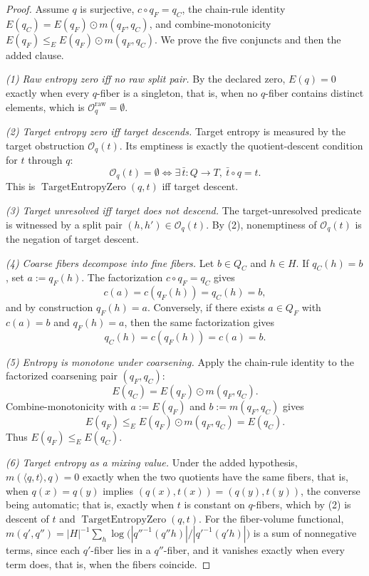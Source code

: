 \begin{proof}
Assume \(q\) is surjective, \(c\circ q_F=q_C\), the chain-rule
identity \(E(q_C)=E(q_F)\odot m(q_F,q_C)\), and combine-monotonicity
\(E(q_F)\le_E E(q_F)\odot m(q_F,q_C)\).  We prove the five conjuncts and then
the added clause.

\emph{(1) Raw entropy zero iff no raw split pair.}
By the declared zero, \(E(q)=0\) exactly when every \(q\)-fiber is a
singleton, that is, when no \(q\)-fiber contains distinct elements,
which is \(\mathcal O_q^{\mathrm{raw}}=\emptyset\).

\emph{(2) Target entropy zero iff target descends.}
Target entropy is measured by the target obstruction
\(\mathcal O_q(t)\).  Its emptiness is exactly the quotient-descent
condition for \(t\) through \(q\):
\[
  \mathcal O_q(t)=\emptyset
  \iff
  \exists\,\bar t:Q\to T,\ \bar t\circ q=t.
\]
This is \(\operatorname{TargetEntropyZero}(q,t)\) iff target descent.

\emph{(3) Target unresolved iff target does not descend.}
The target-unresolved predicate is witnessed by a split pair
\((h,h')\in\mathcal O_q(t)\).  By (2), nonemptiness of
\(\mathcal O_q(t)\) is the negation of target descent.

\emph{(4) Coarse fibers decompose into fine fibers.}
Let \(b\in Q_C\) and \(h\in H\).  If \(q_C(h)=b\), set
\(a:=q_F(h)\).  The factorization \(c\circ q_F=q_C\) gives
\[
  c(a)=c(q_F(h))=q_C(h)=b,
\]
and by construction \(q_F(h)=a\).  Conversely, if there exists
\(a\in Q_F\) with \(c(a)=b\) and \(q_F(h)=a\), then the same
factorization gives
\[
  q_C(h)=c(q_F(h))=c(a)=b.
\]

\emph{(5) Entropy is monotone under coarsening.}
Apply the chain-rule identity to the factorized coarsening pair
\((q_F,q_C)\):
\[
  E(q_C)=E(q_F)\odot m(q_F,q_C).
\]
Combine-monotonicity with \(a:=E(q_F)\) and \(b:=m(q_F,q_C)\) gives
\[
  E(q_F)\le_E E(q_F)\odot m(q_F,q_C)=E(q_C).
\]
Thus \(E(q_F)\le_E E(q_C)\).

\emph{(6) Target entropy as a mixing value.} Under the added hypothesis,
\(m(\langle q,t\rangle,q)=0\) exactly when the two quotients have the same
fibers, that is, when \(q(x)=q(y)\) implies
\((q(x),t(x))=(q(y),t(y))\), the converse being automatic; that is, exactly
when \(t\) is constant on \(q\)-fibers, which by (2) is descent of \(t\) and
\(\operatorname{TargetEntropyZero}(q,t)\). For the fiber-volume functional,
\(m(q',q'')=|H|^{-1}\sum_h\log\bigl(|q''^{-1}(q''h)|/|q'^{-1}(q'h)|\bigr)\) is
a sum of nonnegative terms, since each \(q'\)-fiber lies in a \(q''\)-fiber, and
it vanishes exactly when every term does, that is, when the fibers coincide.
\end{proof}

